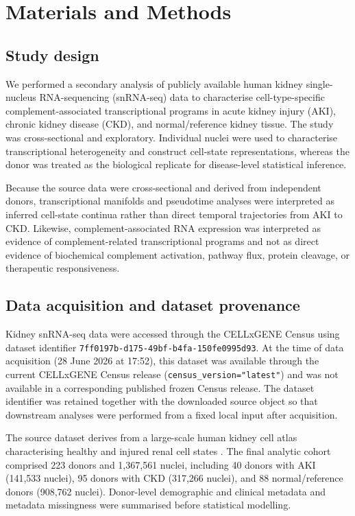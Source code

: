 \documentclass[10pt,letterpaper]{article}
\begin{document}
\section*{Materials and Methods}

\subsection*{Study design}

We performed a secondary analysis of publicly available human kidney single-nucleus RNA-sequencing (snRNA-seq) data to characterise cell-type-specific complement-associated transcriptional programs in acute kidney injury (AKI), chronic kidney disease (CKD), and normal/reference kidney tissue. The study was cross-sectional and exploratory. Individual nuclei were used to characterise transcriptional heterogeneity and construct cell-state representations, whereas the donor was treated as the biological replicate for disease-level statistical inference.

Because the source data were cross-sectional and derived from independent donors, transcriptional manifolds and pseudotime analyses were interpreted as inferred cell-state continua rather than direct temporal trajectories from AKI to CKD. Likewise, complement-associated RNA expression was interpreted as evidence of complement-related transcriptional programs and not as direct evidence of biochemical complement activation, pathway flux, protein cleavage, or therapeutic responsiveness.

\subsection*{Data acquisition and dataset provenance}

Kidney snRNA-seq data were accessed through the CELLxGENE Census \cite{programCZCELLxGENEDiscover2023} using dataset identifier \texttt{7ff0197b-d175-49bf-b4fa-150fe0995d93}. At the time of data acquisition (28 June 2026 at 17:52), this dataset was available through the current CELLxGENE Census release (\texttt{census\_version="latest"}) and was not available in a corresponding published frozen Census release. The dataset identifier was retained together with the downloaded source object so that downstream analyses were performed from a fixed local input after acquisition.

The source dataset derives from a large-scale human kidney cell atlas characterising healthy and injured renal cell states \cite{lakeAtlasHealthyInjured2023}. The final analytic cohort comprised 223 donors and 1,367,561 nuclei, including 40 donors with AKI (141,533 nuclei), 95 donors with CKD (317,266 nuclei), and 88 normal/reference donors (908,762 nuclei). Donor-level demographic and clinical metadata and metadata missingness were summarised before statistical modelling.
\end{document}

